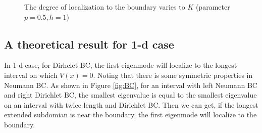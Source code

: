\documentclass[12pt,a4paper]{article}
\begin{document}
\begin{figure}[h]
\centering
{}
\caption{The degree of localization to the boundary varies to $K$ (parameter $p=0.5, h=1$)}
\label{fig:8k}
\end{figure}

\subsection{A theoretical result for 1-d case}

In 1-d case, for Dirhclet BC, the first eigenmode will localize to the longest interval on which $V(x) = 0$. Noting that there is some symmetric properties in Neumann BC. As shown in Figure \ref{fig:BC}, for an interval with left Neumann BC and right Dirichlet BC, the smallest eigenvalue is equal to the smallest eigenvalue on an interval with twice length and Dirichlet BC. Then we can get, if the longest extended subdomian is near the boundary, the first eigenmode will localize to the boundary.
\end{document}
